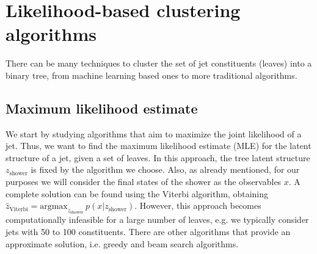 \documentclass[12pt]{article}
\begin{document}
\vspace{0.6cm}
 \section{Likelihood-based clustering algorithms}

 
% 
% 
%

 There can be many techniques to cluster the set of jet constituents (leaves) into a binary tree, from machine learning based ones to more traditional algorithms.
 
\subsection{Maximum likelihood estimate} 
 
 We start by studying algorithms that aim to maximize the joint likelihood of a jet. Thus, we want to find the maximum likelihood estimate (MLE) for the latent structure of a jet, given a set of leaves. In this approach, the tree latent structure $z_{\text{shower}}$ is fixed by the algorithm we choose. Also, as already mentioned, for our purposes we will consider the final states of the shower as the observables $x$. A complete solution can be found using the Viterbi algorithm, obtaining $\hat{z}_{\text{Viterbi}} = \text{argmax}_{z_{\text{shower}}}   \,p(x | z_{\text{shower}}) $. However, this approach becomes computationally infeasible for a large number of leaves, e.g. we typically consider jets with 50 to 100 constituents.
There are other algorithms that provide an approximate solution, i.e. greedy and beam search algorithms.
\end{document}
